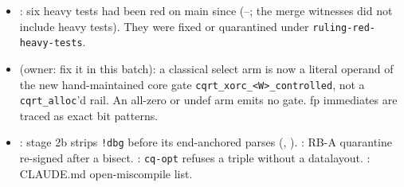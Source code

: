 \begin{itemize}[itemsep=1pt]
\item {}: six heavy tests had been red on main since  (--; the merge witnesses did not include heavy tests). They were fixed or quarantined under \texttt{ruling-red-heavy-tests}.
\item {}  (owner: fix it in this batch): a classical select arm is now a literal operand of the new hand-maintained core gate \texttt{cqrt\_xorc\_<W>\_controlled}, not a \texttt{cqrt\_alloc}'d rail. An all-zero or undef arm emits no gate. fp immediates are traced as exact bit patterns.
\item {}: stage 2b strips \texttt{!dbg} before its end-anchored parses (, ). : RB-A quarantine re-signed after a bisect. : \texttt{cq-opt} refuses a triple without a datalayout. : CLAUDE.md open-miscompile list.
\end{itemize}

